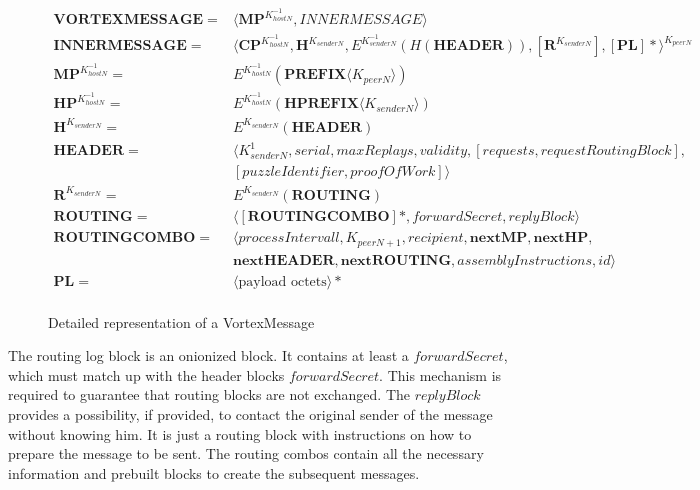 \begin{figure}[!ht]
	\begin{align}
	\mathbf{VORTEXMESSAGE}       = &\langle \mathbf{MP}^{K^{-1}_{hostN}}, INNERMESSAGE \rangle \label{eq:vortexMessage} \\ 
	\mathbf{INNERMESSAGE}        = &\langle \mathbf{CP}^{K^{-1}_{hostN}}, \mathbf{H}^{K_{senderN}}, E^{K^{-1}_{senderN}}\left(H\left(\mathbf{HEADER}\right)\right), \left[\mathbf{R}^{K_{senderN}}\right], \left[\mathbf{PL}\right]*\rangle^{K_{peerN}} \label{eq:innerMessage}\\
	\mathbf{MP}^{K^{-1}_{hostN}} = &E^{K^{-1}_{hostN}}\left(\mathbf{PREFIX}\langle K_{peerN}\rangle \right)\\ 
	\mathbf{HP}^{K^{-1}_{hostN}} = &E^{K^{-1}_{hostN}}\left(\mathbf{HPREFIX}\langle K_{senderN}\rangle \right)\\ 
	\mathbf{H}^{K_{senderN}}     = &E^{K_{senderN}}\left(\mathbf{HEADER}\right)\\  
	\mathbf{HEADER}              = &\langle K^{1}_{senderN}, serial, maxReplays, validity, [requests, requestRoutingBlock],\nonumber\\ 
	& [puzzleIdentifier, proofOfWork] \rangle \\  
	\mathbf{R}^{K_{senderN}}     = & E^{K_{senderN}}\left(\mathbf{ROUTING}\right)\\ 
	\mathbf{ROUTING}             = & \langle [ \mathbf{ROUTINGCOMBO} ] *, forwardSecret, replyBlock \rangle\\  
	\mathbf{ROUTINGCOMBO}        = & \langle processIntervall, K_{peerN+1}, recipient, \mathbf{nextMP}, \mathbf{nextHP}, \nonumber \\
	& \mathbf{nextHEADER}, \mathbf{nextROUTING}, assemblyInstructions, id \rangle\\
	\mathbf{PL}                  = &\langle \text{payload octets} \rangle *\\ 
	\end{align}
	\caption{Detailed representation of a VortexMessage}
	\label{fig:mathMessage}
\end{figure}

The routing log block is an onionized block. It contains at least a $forwardSecret$, which must match up with the header blocks $forwardSecret$. This mechanism is required to guarantee that routing blocks are not exchanged. The $replyBlock$ provides a possibility, if provided, to contact the original sender of the message without knowing him. It is just a routing block with instructions on how to prepare the message to be sent. The routing combos contain all the necessary information and prebuilt blocks to create the subsequent messages.

